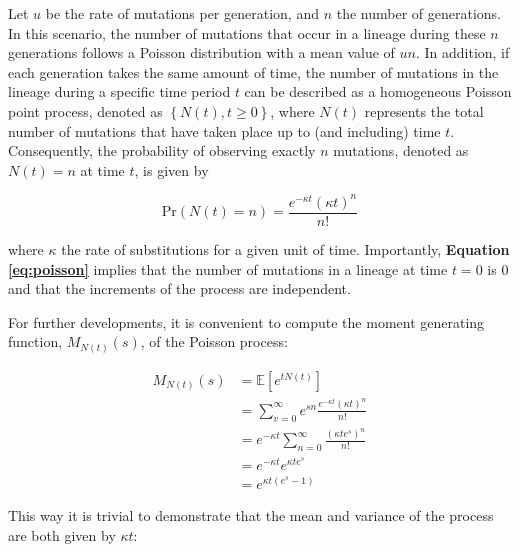 \documentclass{./LatexTemplate/svproc}
\begin{document}
Let $u$ be the rate of mutations per generation, and $n$ the number of generations. In this scenario, the number of mutations that occur in a lineage during these $n$ generations follows a Poisson distribution with a mean value of $un$. In addition, if each generation takes the same amount of time, the number of mutations in the lineage during a specific time period $t$ can be described as a homogeneous Poisson point process, denoted as $\left\{N(t), t \geq 0\right\}$, where $N(t)$ represents the total number of mutations that have taken place up to (and including) time $t$. Consequently, the probability of observing exactly $n$ mutations, denoted as $N(t) = n$ at time $t$, is given by

\begin{equation}
    \text{Pr}(N(t) = n) = \frac{e^{-\kappa t}\left(\kappa t\right)^n}{n!}\label{eq:poisson}
\end{equation}

where $\kappa$ the rate of substitutions for a given unit of time. Importantly, \textbf{Equation \ref{eq:poisson}} implies that the number of mutations in a lineage at time $t = 0$ is $0$ and that the increments of the process are independent.

For further developments, it is convenient to compute the moment generating function, $M_{N(t)}(s)$, of the Poisson process:

\begin{align}
    M_{N(t)}(s) &= \mathbb{E}\left[e^{tN(t)}\right]\\
    &= \sum_{v=0}^{\infty} e^{sn} \frac{e^{-\kappa t}\left(\kappa t\right)^n}{n!}\nonumber\\
    &= e^{-\kappa t} \sum_{n=0}^{\infty} \frac{\left(\kappa t e^s\right)^n}{n!}\nonumber\\
    &= e^{-\kappa t} e^{\kappa t e^s}\nonumber\\
    &= e^{\kappa t (e^s - 1)}
\end{align}

This way it is trivial to demonstrate that the mean and variance of the process are both given by $\kappa t$:
\end{document}
